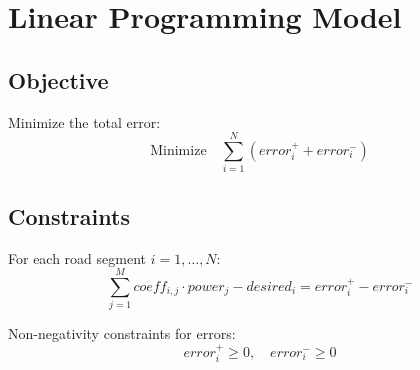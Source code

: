 \documentclass{article}
\begin{document}
\section*{Linear Programming Model}

\subsection*{Objective}

Minimize the total error:
\[
\text{Minimize} \quad \sum_{i=1}^{N} (error^+_i + error^-_i)
\]

\subsection*{Constraints}

For each road segment \( i = 1, \ldots, N \):
\[
\sum_{j=1}^{M} coeff_{i,j} \cdot power_j - desired_i = error^+_i - error^-_i
\]

Non-negativity constraints for errors:
\[
error^+_i \geq 0, \quad error^-_i \geq 0
\]
\end{document}
